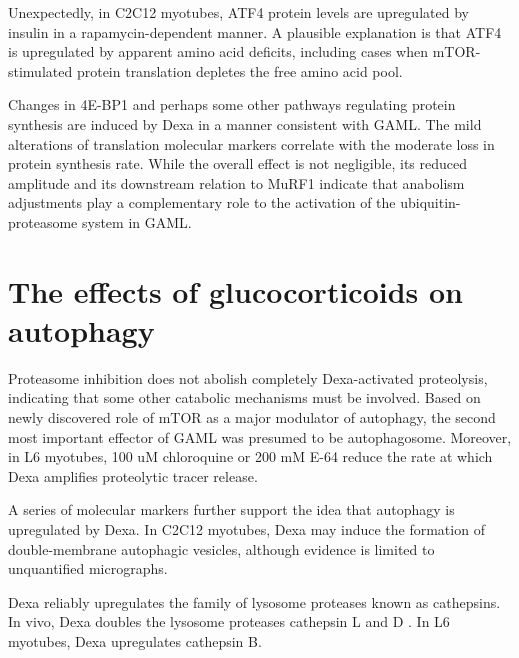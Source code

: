 \documentclass[12pt,english]{report}\usepackage[]{graphicx}\usepackage[]{color}
\begin{document}
Unexpectedly, in C2C12 myotubes, ATF4 protein levels are upregulated
by insulin in a rapamycin-dependent manner\citep{adams2007role}.
A plausible explanation is that ATF4 is upregulated by apparent amino
acid deficits, including cases when mTOR-stimulated protein translation
depletes the free amino acid pool.

Changes in 4E-BP1 and perhaps some other pathways regulating protein
synthesis are induced by Dexa in a manner consistent with GAML. The
mild alterations of translation molecular markers correlate with the
moderate loss in protein synthesis rate. While the overall effect
is not negligible, its reduced amplitude and its downstream relation
to MuRF1 indicate that anabolism adjustments play a complementary
role to the activation of the ubiquitin-proteasome system in GAML.


\section{The effects of glucocorticoids on autophagy}

Proteasome inhibition does not abolish completely Dexa-activated proteolysis,
indicating that some other catabolic mechanisms must be involved.
Based on newly discovered role of mTOR as a major modulator of autophagy,
the second most important effector of GAML was presumed to be autophagosome.
Moreover, in L6 myotubes, 100 uM chloroquine or 200 mM E-64 reduce
the rate at which Dexa amplifies proteolytic tracer release\citep{wang1998dexamethasone}.

A series of molecular markers further support the idea that autophagy
is upregulated by Dexa. In C2C12 myotubes, Dexa may induce the formation
of double-membrane autophagic vesicles, although evidence is limited
to unquantified micrographs\citep{rossi2009cytosolic}.

Dexa reliably upregulates the family of lysosome proteases known as
cathepsins. In vivo, Dexa doubles the lysosome proteases cathepsin
L and D \citep{dardevet1995sensitivity,deval2001identification,nishimura2008effects}.
In L6 myotubes, Dexa upregulates cathepsin B\citep{wang1998dexamethasone}.
\end{document}
